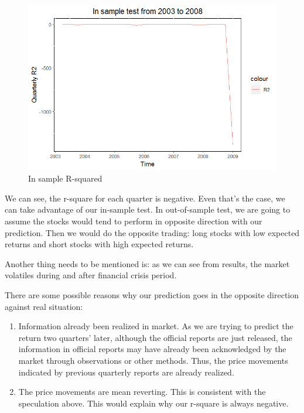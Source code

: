 \documentclass[]{article}
\begin{document}
\begin{figure}[H]
\begin{center}
\includegraphics[width=5in]{Lab//In_sample_r2.jpg}
\caption{In sample R-squared}
\label{figure7}
\end{center}
\end{figure}

We can see, the r-square for each quarter is negative. Even that's the
case, we can take advantage of our in-sample test. In out-of-sample
test, we are going to assume the stocks would tend to perform in
opposite direction with our prediction. Then we would do the opposite
trading: long stocks with low expected returns and short stocks with
high expected returns.

Another thing needs to be mentioned is: as we can see from results, the
market volatiles during and after financial crisis period.

There are some possible reasons why our prediction goes in the opposite
direction against real situation:

\begin{enumerate}
\def\labelenumi{\arabic{enumi}.}
\item
  Information already been realized in market. As we are trying to
  predict the return two quarters' later, although the official reports
  are just released, the information in official reports may have
  already been acknowledged by the market through observations or other
  methods. Thus, the price movements indicated by previous quarterly
  reports are already realized.
\item
  The price movements are mean reverting. This is consistent with the
  speculation above. This would explain why our r-square is always
  negative.
\end{enumerate}
\end{document}
